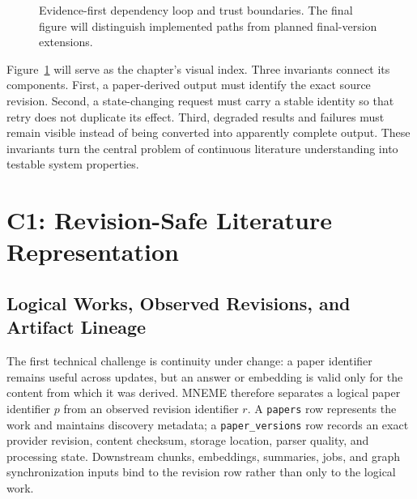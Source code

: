 \begin{figure}[htbp]
\centering
\caption{Evidence-first dependency loop and trust boundaries. The final figure will distinguish implemented paths from planned final-version extensions.}
\label{fig:loop}
\end{figure}

Figure~\ref{fig:loop} will serve as the chapter's visual index. Three invariants connect its components. First, a paper-derived output must identify the exact source revision. Second, a state-changing request must carry a stable identity so that retry does not duplicate its effect. Third, degraded results and failures must remain visible instead of being converted into apparently complete output. These invariants turn the central problem of continuous literature understanding into testable system properties.

\section{C1: Revision-Safe Literature Representation}
\label{sec:c1-revision}

\subsection{Logical Works, Observed Revisions, and Artifact Lineage}

The first technical challenge is continuity under change: a paper identifier remains useful across updates, but an answer or embedding is valid only for the content from which it was derived. MNEME therefore separates a logical paper identifier \(p\) from an observed revision identifier \(r\). A \texttt{papers} row represents the work and maintains discovery metadata; a \texttt{paper\_versions} row records an exact provider revision, content checksum, storage location, parser quality, and processing state. Downstream chunks, embeddings, summaries, jobs, and graph synchronization inputs bind to the revision row rather than only to the logical work.

